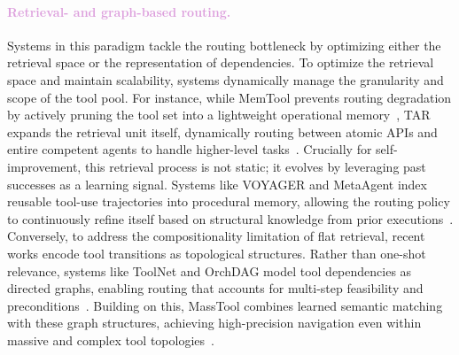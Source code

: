 \paragraph{\textcolor{Plum}{Retrieval- and graph-based routing.}}
Systems in this paradigm tackle the routing bottleneck by optimizing either the retrieval space or the representation of dependencies. To optimize the retrieval space and maintain scalability, systems dynamically manage the granularity and scope of the tool pool. For instance, while MemTool prevents routing degradation by actively pruning the tool set into a lightweight operational memory~\citep{lumer2025memtooloptimizingshorttermmemory}, TAR expands the retrieval unit itself, dynamically routing between atomic APIs and entire competent agents to handle higher-level tasks~\citep{lumer2025tooltoagentretrievalbridgingtools}. Crucially for self-improvement, this retrieval process is not static; it evolves by leveraging past successes as a learning signal. Systems like VOYAGER and MetaAgent index reusable tool-use trajectories into procedural memory, allowing the routing policy to continuously refine itself based on structural knowledge from prior executions~\citep{wang2023voyageropenendedembodiedagent, qian2025metaagentselfevolvingagenttool}. Conversely, to address the compositionality limitation of flat retrieval, recent works encode tool transitions as topological structures. Rather than one-shot relevance, systems like ToolNet and OrchDAG model tool dependencies as directed graphs, enabling routing that accounts for multi-step feasibility and preconditions~\citep{liu2024toolnetconnectinglargelanguage, lu2025orchdagcomplextoolorchestration}. Building on this, MassTool combines learned semantic matching with these graph structures, achieving high-precision navigation even within massive and complex tool topologies~\citep{lin2025masstoolmultitasksearchbasedtool}.



